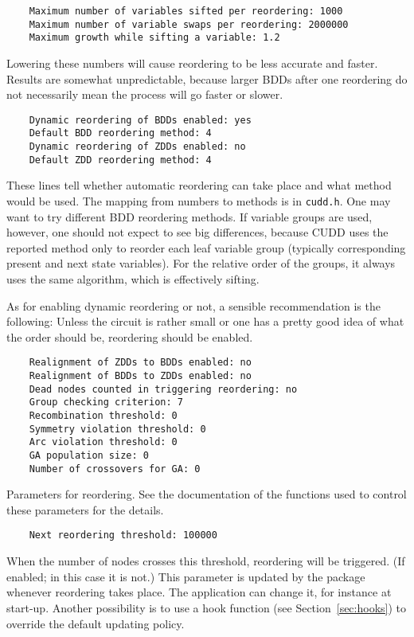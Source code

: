 \documentclass[11pt]{article}
\begin{document}
\begin{verbatim}
    Maximum number of variables sifted per reordering: 1000
    Maximum number of variable swaps per reordering: 2000000
    Maximum growth while sifting a variable: 1.2
\end{verbatim}
Lowering these numbers will cause reordering to be less accurate and
faster. Results are somewhat unpredictable, because larger BDDs after one
reordering do not necessarily mean the process will go faster or slower.

\begin{verbatim}
    Dynamic reordering of BDDs enabled: yes
    Default BDD reordering method: 4
    Dynamic reordering of ZDDs enabled: no
    Default ZDD reordering method: 4
\end{verbatim}
These lines tell whether automatic reordering can take place and what
method would be used.  The mapping from numbers to methods is in
\texttt{cudd.h}.  One may want to try different BDD reordering
methods.  If variable groups are used, however, one should not expect
to see big differences, because CUDD uses the reported method only to
reorder each leaf variable group (typically corresponding present and
next state variables).  For the relative order of the groups, it
always uses the same algorithm, which is effectively sifting.

As for enabling dynamic reordering or not, a sensible recommendation is the
following: Unless the circuit is rather small or one has a pretty good
idea of what the order should be, reordering should be enabled.

\begin{verbatim}
    Realignment of ZDDs to BDDs enabled: no
    Realignment of BDDs to ZDDs enabled: no
    Dead nodes counted in triggering reordering: no
    Group checking criterion: 7
    Recombination threshold: 0
    Symmetry violation threshold: 0
    Arc violation threshold: 0
    GA population size: 0
    Number of crossovers for GA: 0
\end{verbatim}
Parameters for reordering. See the documentation of the functions used
to control these parameters for the details.

\begin{verbatim}
    Next reordering threshold: 100000
\end{verbatim}
When the number of nodes crosses this threshold, reordering will be
triggered. (If enabled; in this case it is not.)  This parameter is
updated by the package whenever reordering takes place.  The
application can change it, for instance at start-up.  Another
possibility is to use a hook function (see Section~\ref{sec:hooks}) to
override the default updating policy.
\end{document}
